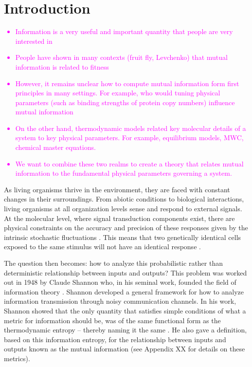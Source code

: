 \section{Introduction}

\textcolor{magenta}{
\begin{itemize}
	\item Information is a very useful and important quantity that people are very interested in
	\item People have shown in many contexts (fruit fly, Levchenko) that mutual information is related to fitness
	\item However, it remains unclear how to compute mutual information form first principles in many settings. For example, who would tuning physical parameters (such as binding strengths of protein copy numbers) influence mutual information
	\item On the other hand, thermodynamic models related key molecular details of a system to key physical parameters. For example, equilibrium models, MWC, chemical master equations.
	\item We want to combine these two realms to create a theory that relates mutual information to the fundamental physical parameters governing a system.
\end{itemize}
}

As living organisms thrive in the environment, they are faced with constant
changes in their surroundings. From abiotic conditions to biological
interactions, living organisms at all organization levels sense and respond to
external signals. At the molecular level, where signal transduction components
exist, there are physical constraints on the accuracy and precision of these
responses given by the intrinsic stochastic fluctuations  \cite{Nemenman2010}.
This means that two genetically identical cells exposed to the same stimulus
will not have an identical response \cite{Eldar2010}.

The question then becomes: how to analyze this probabilistic rather than
deterministic relationship between inputs and outputs? This problem was worked
out in 1948 by Claude Shannon who, in his seminal work, founded the field of
information theory \cite{Shannon1948}. Shannon developed a general framework for
how to analyze information transmission through noisy communication channels. In
his work, Shannon showed that the only quantity that satisfies simple
conditions of what a metric for information should be, was of the same
functional form as the thermodynamic entropy -- thereby naming it the same
\cite{MacKay2003}. He also gave a definition, based on this information entropy,
for the relationship between inputs and outputs known as the mutual information
(see Appendix XX for details on these metrics).

